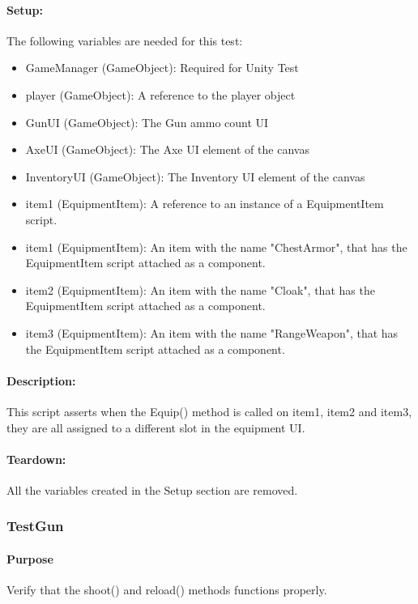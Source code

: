 \documentclass[12pt, titlepage]{article}
\begin{document}
\paragraph{Setup: } The following variables are needed for this test:
\begin{itemize}
	\item GameManager (GameObject): Required for Unity Test
	\item  player (GameObject): A reference to the player object
	\item  GunUI (GameObject): The Gun ammo count UI
	\item AxeUI (GameObject): The Axe UI element of the canvas
	\item InventoryUI (GameObject): The Inventory UI element of the canvas
	\item item1 (EquipmentItem): A reference to an instance of a EquipmentItem script.
	\item item1 (EquipmentItem): An item with the name "ChestArmor", that has the EquipmentItem script attached as a component.
	\item item2 (EquipmentItem): An item with the name "Cloak", that has the EquipmentItem script attached as a component.
	\item item3 (EquipmentItem): An item with the name "RangeWeapon", that has the EquipmentItem script attached as a component.
	
\end{itemize}
\paragraph{Description: }
This script asserts when the Equip() method is called on item1, item2 and item3, they are all assigned to a different slot in the equipment UI.

\paragraph{Teardown: } All the variables created in the Setup section are removed.
\subsubsection{Test\textunderscore Gun}

\paragraph{Purpose} Verify that the shoot() and reload() methods functions properly.
\end{document}
